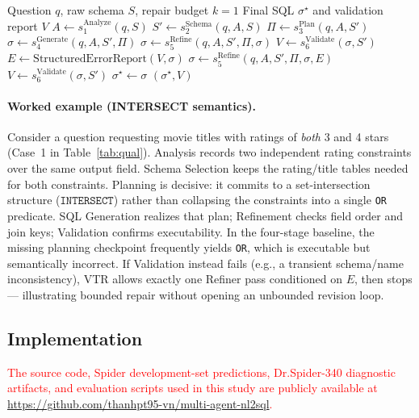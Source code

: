 \documentclass{svproc}
\begin{document}
{\begin{algorithm}[t]
\caption{Six-stage NL2SQL with Validation-Triggered Repair (\(k=1\)).}
\label{alg:sixstage-vtr}
\begin{algorithmic}[1]
\Require Question \(q\), raw schema \(S\), repair budget \(k=1\)
\Ensure Final SQL \(\sigma^\star\) and validation report \(V\)
\State \(A \gets s_1^{\mathrm{Analyze}}(q,S)\)
\State \(S' \gets s_2^{\mathrm{Schema}}(q,A,S)\)
\State \(\Pi \gets s_3^{\mathrm{Plan}}(q,A,S')\)
\State \(\sigma \gets s_4^{\mathrm{Generate}}(q,A,S',\Pi)\)
\State \(\sigma \gets s_5^{\mathrm{Refine}}(q,A,S',\Pi,\sigma)\)
\State \(V \gets s_6^{\mathrm{Validate}}(\sigma,S')\)
    \State \(E \gets \mathrm{StructuredErrorReport}(V,\sigma)\)
    \State \(\sigma \gets s_5^{\mathrm{Refine}}(q,A,S',\Pi,\sigma,E)\)
    \State \(V \gets s_6^{\mathrm{Validate}}(\sigma,S')\)
\EndIf
\State \(\sigma^\star \gets \sigma\)
\State \Return \((\sigma^\star,V)\)
\end{algorithmic}
\end{algorithm}

\paragraph{Worked example (INTERSECT semantics).}
Consider a question requesting movie titles with ratings of \emph{both}
3 and 4 stars (Case~1 in Table~\ref{tab:qual}).
Analysis records two independent rating constraints over the same output field.
Schema Selection keeps the rating/title tables needed for both constraints.
Planning is decisive: it commits to a set-intersection structure
(\(\texttt{INTERSECT}\)) rather than collapsing the constraints into a single
\texttt{OR} predicate.
SQL Generation realizes that plan; Refinement checks field order and join keys;
Validation confirms executability.
In the four-stage baseline, the missing planning checkpoint frequently yields
\texttt{OR}, which is executable but semantically incorrect.
If Validation instead fails (e.g., a transient schema/name inconsistency),
VTR allows exactly one Refiner pass conditioned on \(E\), then stops---
illustrating bounded repair without opening an unbounded revision loop.
}

\subsection{Implementation}
\textcolor{red}{The source code, Spider development-set predictions, Dr.Spider-340 diagnostic artifacts, and evaluation scripts used in this study are publicly available at \url{https://github.com/thanhpt95-vn/multi-agent-nl2sql}.}
\label{subsec:impl}
\end{document}
